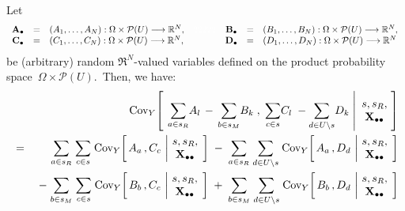 
\clearpage
\begin{lemma}\label{sRsMPullOutOfCovariance}
\mbox{}
\vskip 0.1cm
\noindent
Let
\begin{equation*}
\begin{array}{cclcccl}
\mathbf{A}_{\bullet} & = & (A_{1},\ldots,A_{N}) : \Omega\times\mathcal{P}(U) \longrightarrow \Re^{N},
&{\color{white}22222}&
\mathbf{B}_{\bullet} & = & (B_{1},\ldots,B_{N}) : \Omega\times\mathcal{P}(U) \longrightarrow \Re^{N},
\\
\mathbf{C}_{\bullet} & = & (C_{1},\ldots,C_{N}) : \Omega\times\mathcal{P}(U) \longrightarrow \Re^{N},
&&
\mathbf{D}_{\bullet} & = & (D_{1},\ldots,D_{N}) : \Omega\times\mathcal{P}(U) \longrightarrow \Re^{N}{\color{white},}
\end{array}
\end{equation*}
be (arbitrary) random $\Re^{N}$-valued variables defined on the product probability space
\,$\Omega\times\mathcal{P}(U)$.\,
Then, we have:
\begin{eqnarray*}
&&
    \Cov_{Y}\!\left[\;
        \left.
        \underset{a \in s_{R}}{\sum}A_{l}
        \,-\,
        \underset{b \in s_{M}}{\sum}B_{k}
        \;,\;
        \underset{c \in s}{\sum}C_{l}
        \;-
        \underset{d \in U \backslash s}{\sum}D_{k}
        \;\right\vert\!
        \begin{array}{c} s,s_{R}, \\ \Xobs \end{array}
        \!\right]
\\
& = &
    \underset{a \in s_{R}}{\sum}\;
    \underset{c \in s}{\sum}\;
    \Cov_{Y}\!\left[\,
        A_{a} \,, C_{c}
        \,\left\vert\!
        \begin{array}{c} s,s_{R}, \\ \Xobs \end{array}
        \right.
        \!\right]
    \; - \;
    \underset{a \in s_{R}}{\sum}\;
    \underset{d \in U \backslash s}{\sum}\;
    \Cov_{Y}\!\left[\,
        A_{a} \,, D_{d}
        \,\left\vert\!
        \begin{array}{c} s,s_{R}, \\ \Xobs \end{array}
        \right.
        \!\right]
\\
&&
    \; - \;
    \underset{b \in s_{M}}{\sum}\;
    \underset{c \in s}{\sum}\;
    \Cov_{Y}\!\left[\,
        B_{b} \,, C_{c}
        \,\left\vert\!
        \begin{array}{c} s,s_{R}, \\ \Xobs \end{array}
        \right.
        \!\right]
    \; + \;
    \underset{b \in s_{M}}{\sum}\;
    \underset{d \in U \backslash s}{\sum}\;
    \Cov_{Y}\!\left[\,
        B_{b} \,, D_{d}
        \,\left\vert\!
        \begin{array}{c} s,s_{R}, \\ \Xobs \end{array}
        \right.
        \!\right]
\end{eqnarray*}
\end{lemma}
